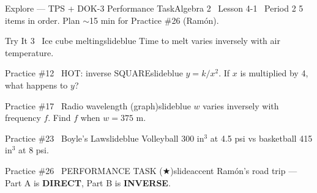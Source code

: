 \documentclass[aspectratio=169, 14pt]{beamer}
\begin{document}
\begin{frame}{Explore --- TPS + DOK-3 Performance Task}{Algebra 2 \textperiodcentered\ Lesson 4-1 \textperiodcentered\ Period 2}
\small\textcolor{slidegray}{5 items in order. Plan \(\sim\)15 min for Practice \#26 (Ramón).}

\vspace{0.15cm}
\begin{projcard}{Try It 3 \textperiodcentered\ Ice cube melting}{slideblue}
Time to melt varies inversely with air temperature.
\end{projcard}
\vspace{-0.15cm}
\begin{projcard}{Practice \#12 \textperiodcentered\ HOT: inverse SQUARE}{slideblue}
\(y = k/x^2\). If \(x\) is multiplied by 4, what happens to \(y\)?
\end{projcard}
\vspace{-0.15cm}
\begin{projcard}{Practice \#17 \textperiodcentered\ Radio wavelength (graph)}{slideblue}
\(w\) varies inversely with frequency \(f\). Find \(f\) when \(w = 375\) m.
\end{projcard}
\vspace{-0.15cm}
\begin{projcard}{Practice \#23 \textperiodcentered\ Boyle's Law}{slideblue}
Volleyball 300 in\(^3\) at 4.5 psi vs basketball 415 in\(^3\) at 8 psi.
\end{projcard}
\vspace{-0.15cm}
\begin{projcard}{Practice \#26 \textperiodcentered\ PERFORMANCE TASK (\(\bigstar\))}{slideaccent}
Ramón's road trip --- Part A is \textbf{DIRECT}, Part B is \textbf{INVERSE}.
\end{projcard}
\end{frame}
\end{document}
